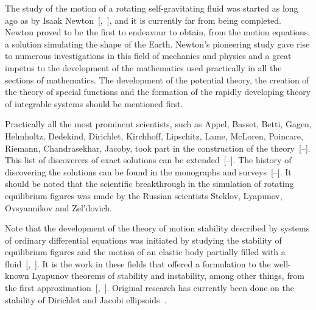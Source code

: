 
\renewcommand{\JournalDataOnline}{\displaydate{privalovae}}






\makeentitle






The study of the motion of a rotating self-gravitating fluid was started as long ago as by Isaak Newton~[,~], and it is currently far from being completed. Newton proved to be the first to endeavour to obtain, from the motion equations, a solution simulating the shape of the Earth. Newton’s pioneering study gave rise to numerous investigations in this field of mechanics and physics and a great impetus to the development of the mathematics used practically in all the sections of mathematics. The development of the potential theory, the creation of the theory of special functions and the formation of the rapidly developing theory of integrable systems should be mentioned first.



Practically all the most prominent scientists, such as Appel, Basset, Betti, Gagen, Helmholtz, Dedekind, Dirichlet, Kirchhoff, Lipschitz, Lame, McLoren, Poincare, Riemann, Chandrasekhar, Jacoby, took part in the construction of the theory~[--]. This list of discoverers of exact solutions can be extended~[--]. The history of discovering the solutions can be found in the monographs and surveys~[--]. It should be noted that the scientific breakthrough in the simulation of rotating equilibrium figures was made by the Russian scientists Steklov, Lyapunov, Ovsyannikov and Zel'dovich.



Note that the development of the theory of motion stability described by systems of ordinary differential equations was initiated by studying the stability of equilibrium figures and the motion of an elastic body partially filled with a fluid~[,~]. It is the work in these fields that offered a formulation to the well-known Lyapunov theorems of stability and instability, among other things, from the first approximation~[,~]. Original research has currently been done on the stability of Dirichlet and Jacobi ellipsoids~\cite{ulg:bib:Borisov}.



